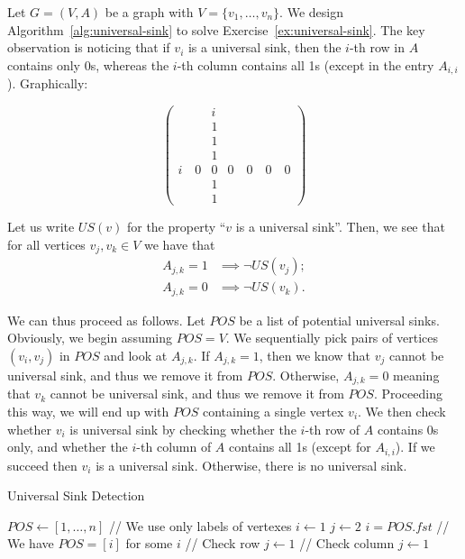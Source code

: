 \begin{solution}
	Let $G = (V,A)$ be a graph with $V = \{v_1,\ldots,v_n\}$. We design Algorithm~\ref{alg:universal-sink} to solve Exercise~\ref{ex:universal-sink}.
	The key observation is noticing that if $v_i$ is a universal sink, then the $i$-th row in $A$ contains only 0s, whereas the $i$-th column contains all 1s (except in the entry $A_{i,i}$). Graphically:

	\[
		\begin{pmatrix}
			          & i &                           \\
			          & 1 &                           \\
			          & 1 &                           \\
			          & 1 &                           \\
			i \quad 0 & 0 & 0 \quad 0 \quad 0 \quad 0 \\
			          & 1 &                           \\
			          & 1 &
		\end{pmatrix}
	\]

	Let us write $US(v)$ for the property ``$v$ is a universal sink''. Then, we see that for all vertices $v_j,v_k \in V$ we have that
	\[
		\begin{aligned}
			A_{j,k} = 1 & \implies \neg US(v_j); \\
			A_{j,k} = 0 & \implies \neg US(v_k).
		\end{aligned}
	\]

	We can thus proceed as follows. Let $POS$ be a list of potential universal sinks. Obviously, we begin assuming $POS = V$. We sequentially pick pairs of vertices $(v_i,v_j)$ in $POS$ and look at $A_{j,k}$. If $A_{j,k} = 1$, then we know that $v_j$ cannot be universal sink, and thus we remove it from $POS$. Otherwise, $A_{j,k} = 0$ meaning that $v_k$ cannot be universal sink, and thus we remove it from $POS$. Proceeding this way, we will end up with $POS$ containing a single vertex $v_i$. We then check whether $v_i$ is universal sink by checking whether the $i$-th row of $A$ contains 0s only, and whether the $i$-th column of $A$ contains all 1s (except for $A_{i,i}$). If we succeed then $v_i$ is a universal sink. Otherwise, there is no universal sink.

	\begin{algorithm}
		\caption{Universal Sink Detection}\label{alg:universal-sink}
		$POS \gets [1,\ldots,n]$\;
		// We use only labels of vertexes
		$i \gets 1$\;
		$j \gets 2$\;
		$i = POS.fst$\;
		// We have $POS = [i]$ for some $i$
		// Check row
		$j \gets 1$\;
		// Check column
		$j \gets 1$\;
		\;
	\end{algorithm}


\end{solution}
